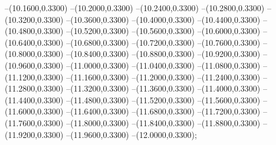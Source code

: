 {	--(10.1600,0.3300)
	--(10.2000,0.3300)
	--(10.2400,0.3300)
	--(10.2800,0.3300)
	--(10.3200,0.3300)
	--(10.3600,0.3300)
	--(10.4000,0.3300)
	--(10.4400,0.3300)
	--(10.4800,0.3300)
	--(10.5200,0.3300)
	--(10.5600,0.3300)
	--(10.6000,0.3300)
	--(10.6400,0.3300)
	--(10.6800,0.3300)
	--(10.7200,0.3300)
	--(10.7600,0.3300)
	--(10.8000,0.3300)
	--(10.8400,0.3300)
	--(10.8800,0.3300)
	--(10.9200,0.3300)
	--(10.9600,0.3300)
	--(11.0000,0.3300)
	--(11.0400,0.3300)
	--(11.0800,0.3300)
	--(11.1200,0.3300)
	--(11.1600,0.3300)
	--(11.2000,0.3300)
	--(11.2400,0.3300)
	--(11.2800,0.3300)
	--(11.3200,0.3300)
	--(11.3600,0.3300)
	--(11.4000,0.3300)
	--(11.4400,0.3300)
	--(11.4800,0.3300)
	--(11.5200,0.3300)
	--(11.5600,0.3300)
	--(11.6000,0.3300)
	--(11.6400,0.3300)
	--(11.6800,0.3300)
	--(11.7200,0.3300)
	--(11.7600,0.3300)
	--(11.8000,0.3300)
	--(11.8400,0.3300)
	--(11.8800,0.3300)
	--(11.9200,0.3300)
	--(11.9600,0.3300)
	--(12.0000,0.3300);
}
